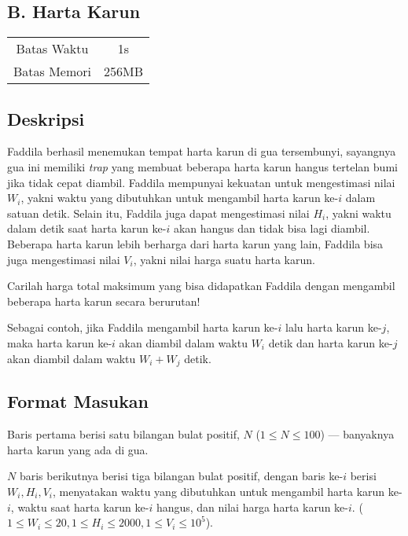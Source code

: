 \documentclass{article}
\begin{document}
\begin{center}
    \section*{B. Harta Karun} %

    \begin{tabular}{ | c c | }
        \hline
        Batas Waktu  & 1s \\    %
        Batas Memori & 256MB \\  %
        \hline
    \end{tabular}
\end{center}

\subsection*{Deskripsi}

Faddila berhasil menemukan tempat harta karun di gua tersembunyi, sayangnya gua ini memiliki \textit{trap} yang membuat beberapa harta karun hangus tertelan bumi jika tidak cepat diambil. Faddila mempunyai kekuatan untuk mengestimasi nilai $W_i$, yakni waktu yang dibutuhkan untuk mengambil harta karun ke-$i$ dalam satuan detik. Selain itu, Faddila juga dapat mengestimasi nilai $H_i$, yakni waktu dalam detik saat harta karun ke-$i$ akan hangus dan tidak bisa lagi diambil. Beberapa harta karun lebih berharga dari harta karun yang lain, Faddila bisa juga mengestimasi nilai $V_i$, yakni nilai harga suatu harta karun.

Carilah harga total maksimum yang bisa didapatkan Faddila dengan mengambil beberapa harta karun secara berurutan! 

Sebagai contoh, jika Faddila mengambil harta karun ke-$i$ lalu harta karun ke-$j$, maka harta karun ke-$i$ akan diambil dalam waktu $W_i$ detik dan harta karun ke-$j$ akan diambil dalam waktu $W_i + W_j$ detik.

\subsection*{Format Masukan}

Baris pertama berisi satu bilangan bulat positif, $N$ ($1 \leq N \leq 100$) — banyaknya harta karun yang ada di gua.

$N$ baris berikutnya berisi tiga bilangan bulat positif, dengan baris ke-$i$ berisi $W_i, H_i, V_i$, menyatakan waktu yang dibutuhkan untuk mengambil harta karun ke-$i$, waktu saat harta karun ke-$i$ hangus, dan nilai harga harta karun ke-$i$. ($1 \leq W_i \leq 20, 1 \leq H_i \leq 2000, 1 \leq V_i \leq 10^5$).
\end{document}
